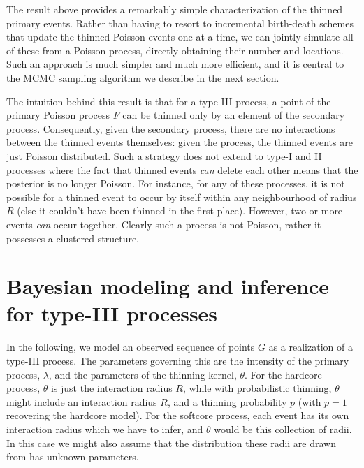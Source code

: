 \documentclass{statsoc}
\begin{document}
The result above provides a remarkably simple characterization of the thinned primary events. 
Rather than having to resort to incremental birth-death schemes that update the thinned Poisson events one at a time, we can 
jointly simulate all of these from a Poisson process, directly obtaining their number and locations. 
Such an approach is much simpler and much more efficient, and it is
central to the MCMC sampling algorithm  we describe in the next section.

The intuition behind this result is that for a type-III process, a point of the primary Poisson process $F$ can
be thinned only by an element of the secondary process. Consequently, given the
secondary process, there are no interactions between the thinned events themselves: given the \matern process, the thinned events are just 
Poisson distributed. Such a strategy does not extend to
\matern type-I and II processes where the fact that thinned events \emph{can} delete each other means that the posterior is
no longer Poisson. For instance, for any of these processes, it is not possible for a thinned event to occur by itself within any neighbourhood
of radius $R$ (else it couldn't have been thinned in the first place). However, two or more events \emph{can} occur together. Clearly such a process is not 
Poisson, rather it possesses a clustered structure.


\section{Bayesian modeling and inference for \matern type-III processes} \label{sec:inf_mat}


  In the following, we model an observed sequence of points $G$ as a realization of a \matern type-III process. The parameters governing this are
the intensity of the primary process, $\lambda$, and the parameters of the thinning kernel, $\theta$. For the hardcore process, $\theta$ is just
the interaction radius $R$, while with probabilistic thinning, $\theta$ might include an interaction radius $R$, and a thinning
probability $p$ (with $p = 1$ recovering the hardcore model). 
For the softcore process, each \matern event has its own interaction radius which we have to
infer, and $\theta$ would be this collection of radii. In this case we might also assume that the distribution these radii are drawn from 
has unknown parameters.
\end{document}
